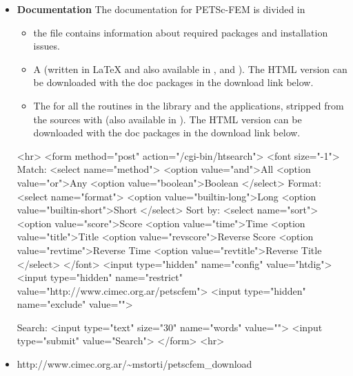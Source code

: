 \documentclass[11pt]{article}
\begin{document}
\begin{itemize}
\item \textbf{Documentation}
The documentation for PETSc-FEM is divided in 

\begin{itemize}
\item the  file contains
information about required packages and installation issues.

\item A 
(written in \LaTeX{} and also available in
, and
). The HTML version can be
downloaded with the doc packages in the download link below. 

\item The  for
all the routines in the library and the applications, stripped from
the sources with
(also available in ). The
HTML version can be downloaded with the doc packages in the download
link below.
\end{itemize}

\begin{rawhtml}
<hr>
<form method="post" action="/cgi-bin/htsearch">
<font size="-1">
Match: <select name="method">
<option value="and">All
<option value="or">Any
<option value="boolean">Boolean
</select>
Format: <select name="format">
<option value="builtin-long">Long
<option value="builtin-short">Short
</select>
Sort by: <select name="sort">
<option value="score">Score
<option value="time">Time
<option value="title">Title
<option value="revscore">Reverse Score
<option value="revtime">Reverse Time
<option value="revtitle">Reverse Title
</select>
</font>
<input type="hidden" name="config" value="htdig">
<input type="hidden" name="restrict" value="http://www.cimec.org.ar/petscfem">
<input type="hidden" name="exclude" value="">

Search:
<input type="text" size="30" name="words" value="">
<input type="submit" value="Search">
</form>
<hr>
\end{rawhtml}

\item {}
                {http://www.cimec.org.ar/\~{}mstorti/petscfem_download}

\end{itemize}
\end{document}
